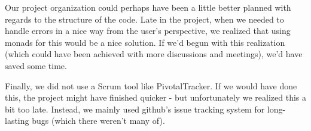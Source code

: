 \documentclass[11pt]{article}
\begin{document}
Our project organization could perhaps have been a little better planned with regards to the structure of the code.
Late in the project, when we needed to handle errors in a nice way from the user's perspective, we realized that using monads for this would be a nice solution.
If we'd begun with this realization (which could have been achieved with more discussions and meetings), we'd have saved some time.

Finally, we did not use a Scrum tool like PivotalTracker. If we would have done this, the project might have finished quicker - but unfortunately we realized this a bit too late.
Instead, we mainly used github's issue tracking system for long-lasting bugs (which there weren't many of).

\newpage


\newpage

\end{document}
